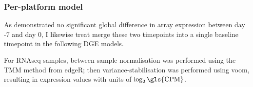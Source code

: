 

\subsubsection{Per-platform  model}

As \autocite{sobolev2016AdjuvantedInfluenzaH1N1Vaccination} demonstrated no significant global difference in array expression between day -7 and day 0, I likewise treat merge these two timepoints into a single baseline timepoint in the following \gls{DGE} models.

For \gls{RNAseq} samples, between-sample normalisation was performed using the \gls{TMM} method\autocite{evans2018SelectingBetweensampleRNASeq} from edgeR\autocite{robinson2010EdgeRBioconductorPackage}; 
then variance-stabilisation was performed using voom\autocite{law2014VoomPrecisionWeights}, resulting in expression values with units of $\log_2{\text{\gls{CPM}}}$.

